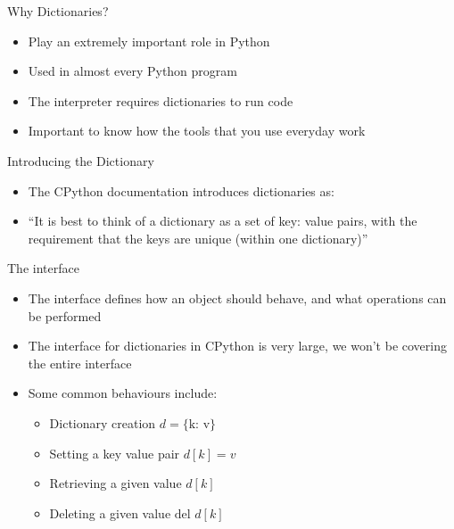 \documentclass[12pt, aspectration=1610]{beamer}
\begin{document}
    \begin{frame}{Why Dictionaries?}
        \begin{itemize}
            \item Play an extremely important role in Python
            \item Used in almost every Python program
            \item The interpreter requires dictionaries to run code
            \item Important to know how the tools that you use everyday work 
        \end{itemize}
    \end{frame}

    \begin{frame}{Introducing the Dictionary}
        \begin{itemize}
            \item The CPython documentation introduces dictionaries as:
            \item ``It is best to think of a dictionary as a set of key: value pairs, with the requirement that the keys are unique (within one dictionary)''
        \end{itemize}
    \end{frame}
    
    \begin{frame}{The interface}
        \begin{itemize}
            \item The interface defines how an object should behave, and what operations can be performed
            \item The interface for dictionaries in CPython is very large, we won't be covering the entire interface
            \item Some common behaviours include:
                \begin{itemize}
                    \item Dictionary creation $d = \text{\{k: v\}}$
                    \item Setting a key value pair $d[k] = v$
                    \item Retrieving a given value $d[k]$ 
                    \item Deleting a given value $\text{del }d[k]$
                \end{itemize}
        \end{itemize}
    \end{frame}
\end{document}
